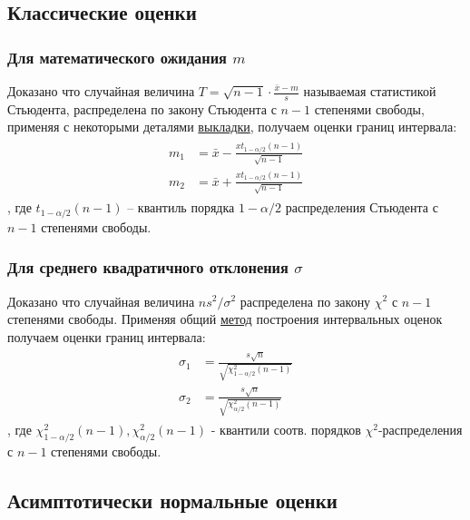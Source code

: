 \documentclass[12pt,a4paper]{article}
\begin{document}
\subsection{Классические оценки}
\subsubsection{Для математического ожидания $m$}
Доказано что случайная величина $T = \sqrt{n-1} \cdot \frac{\bar{x} - m}{s}$ называемая статистикой Стьюдента, распределена по закону Стьюдента с $n-1$ степенями свободы, применяя с некоторыми деталями\cite[стр. 457 -- 458]{verrazdely} \hyperref[method]{выкладки}, получаем оценки границ интервала:
\begin{align}\label{lab8:1}
\begin{split}
	m_1 &= \bar{x} - \frac{x t_{1 - \alpha / 2} (n-1)}{\sqrt{n-1}} \\
	m_2 &= \bar{x} + \frac{x t_{1 - \alpha / 2} (n-1)}{\sqrt{n-1}}
\end{split}
\end{align}
, где $t_{1 - \alpha / 2}(n-1)$ -- квантиль порядка $1 - \alpha / 2$ распределения Стьюдента с $n-1$ степенями свободы.

\subsubsection{Для среднего квадратичного отклонения $\sigma$}
Доказано что случайная величина $n s^2 / \sigma^2$ распределена по закону $\chi^2$ с $n-1$ степенями свободы. Применяя общий \hyperref[method]{метод} построения интервальных оценок получаем оценки границ интервала:
\begin{align}\label{lab8:2}
\begin{split}
	\sigma_1 &= \frac{s \sqrt{n}}{\sqrt{\chi_{1-\alpha / 2}^{2}(n-1)}} \\
	\sigma_2 &= \frac{s \sqrt{n}}{\sqrt{\chi_{\alpha / 2}^{2}(n-1)}}
\end{split}
\end{align}
, где $\chi_{1 - \alpha / 2}^{2}(n-1), \chi_{\alpha / 2}^{2}(n-1)$ - квантили соотв. порядков $\chi^2$-распределения с $n-1$ степенями свободы.

\subsection{Асимптотически нормальные оценки}
\end{document}

